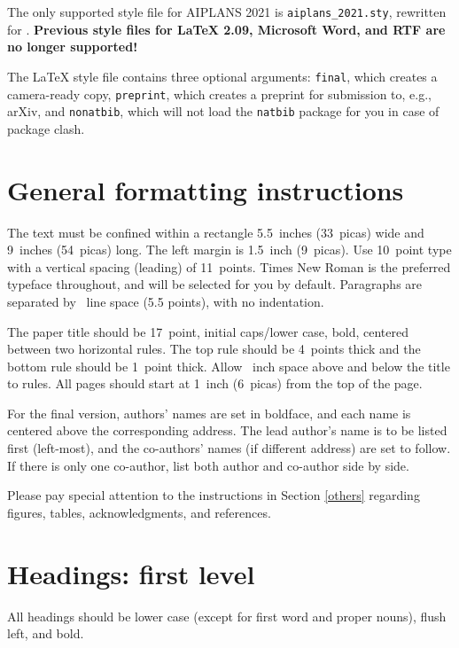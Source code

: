 \documentclass{article}
\begin{document}
  The only supported style file for AIPLANS 2021 is \verb+aiplans_2021.sty+,
  rewritten for \LaTeXe{}.  \textbf{Previous style files for \LaTeX{} 2.09,
    Microsoft Word, and RTF are no longer supported!}

  The \LaTeX{} style file contains three optional arguments: \verb+final+, which
  creates a camera-ready copy, \verb+preprint+, which creates a preprint for
  submission to, e.g., arXiv, and \verb+nonatbib+, which will not load the
  \verb+natbib+ package for you in case of package clash.

  \section{General formatting instructions}
  \label{gen_inst}

  The text must be confined within a rectangle 5.5~inches (33~picas) wide and
  9~inches (54~picas) long. The left margin is 1.5~inch (9~picas).  Use 10~point
  type with a vertical spacing (leading) of 11~points.  Times New Roman is the
  preferred typeface throughout, and will be selected for you by default.
  Paragraphs are separated by ~line space (5.5 points), with no
  indentation.

  The paper title should be 17~point, initial caps/lower case, bold, centered
  between two horizontal rules. The top rule should be 4~points thick and the
  bottom rule should be 1~point thick. Allow ~inch space above and
  below the title to rules. All pages should start at 1~inch (6~picas) from the
  top of the page.

  For the final version, authors' names are set in boldface, and each name is
  centered above the corresponding address. The lead author's name is to be listed
  first (left-most), and the co-authors' names (if different address) are set to
  follow. If there is only one co-author, list both author and co-author side by
  side.

  Please pay special attention to the instructions in Section \ref{others}
  regarding figures, tables, acknowledgments, and references.

  \section{Headings: first level}
  \label{headings}

  All headings should be lower case (except for first word and proper nouns),
  flush left, and bold.
\end{document}
